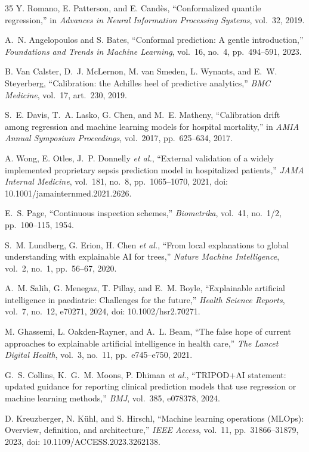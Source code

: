 \begin{thebibliography}{35}
Y. Romano, E. Patterson, and E. Candès, ``Conformalized quantile regression,'' in \emph{Advances in Neural Information Processing Systems}, vol.~32, 2019.

A.~N. Angelopoulos and S. Bates, ``Conformal prediction: A gentle introduction,'' \emph{Foundations and Trends in Machine Learning}, vol.~16, no.~4, pp.~494--591, 2023.

B. Van Calster, D.~J. McLernon, M. van Smeden, L. Wynants, and E.~W. Steyerberg, ``Calibration: the Achilles heel of predictive analytics,'' \emph{BMC Medicine}, vol.~17, art.~230, 2019.

S.~E. Davis, T.~A. Lasko, G. Chen, and M.~E. Matheny, ``Calibration drift among regression and machine learning models for hospital mortality,'' in \emph{AMIA Annual Symposium Proceedings}, vol.~2017, pp.~625--634, 2017.

A. Wong, E. Otles, J.~P. Donnelly \emph{et al.}, ``External validation of a widely implemented proprietary sepsis prediction model in hospitalized patients,'' \emph{JAMA Internal Medicine}, vol.~181, no.~8, pp.~1065--1070, 2021, doi: 10.1001/jamainternmed.2021.2626.

E.~S. Page, ``Continuous inspection schemes,'' \emph{Biometrika}, vol.~41, no.~1/2, pp.~100--115, 1954.

S.~M. Lundberg, G. Erion, H. Chen \emph{et al.}, ``From local explanations to global understanding with explainable AI for trees,'' \emph{Nature Machine Intelligence}, vol.~2, no.~1, pp.~56--67, 2020.

A.~M. Salih, G. Menegaz, T. Pillay, and E.~M. Boyle, ``Explainable artificial intelligence in paediatric: Challenges for the future,'' \emph{Health Science Reports}, vol.~7, no.~12, e70271, 2024, doi: 10.1002/hsr2.70271.

M. Ghassemi, L. Oakden-Rayner, and A.~L. Beam, ``The false hope of current approaches to explainable artificial intelligence in health care,'' \emph{The Lancet Digital Health}, vol.~3, no.~11, pp.~e745--e750, 2021.

G.~S. Collins, K.~G.~M. Moons, P. Dhiman \emph{et al.}, ``TRIPOD+AI statement: updated guidance for reporting clinical prediction models that use regression or machine learning methods,'' \emph{BMJ}, vol.~385, e078378, 2024.

D. Kreuzberger, N. Kühl, and S. Hirschl, ``Machine learning operations (MLOps): Overview, definition, and architecture,'' \emph{IEEE Access}, vol.~11, pp.~31866--31879, 2023, doi: 10.1109/ACCESS.2023.3262138.


\end{thebibliography}
